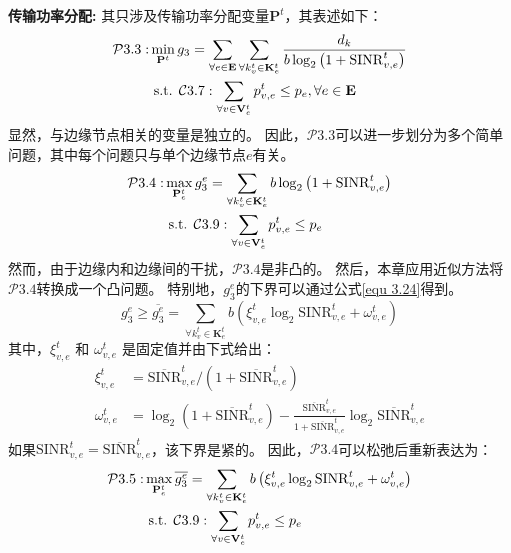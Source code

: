 \textbf{传输功率分配:} 其只涉及传输功率分配变量$\mathbf{P}^{t}$，其表述如下：
\begin{align}
	\mathcal{P}3.3: &\min_{\mathbf{P}^{t}} g_3= \sum_{ \forall e \in \mathbf{E}} \sum_{\forall k_{v}^{t} \in \mathbf{K}_{e}^{t}}  \frac{d_{k}}{b  \log _{2}\left(1+\mathrm{SINR}_{v, e}^t\right)} \notag \\
	&\text { s.t. } \mathcal{C}3.7: \sum_{\forall v \in \mathbf{V}_{e}^{t}} p_{v, e}^{t} \leq p_{e}, \forall e \in \mathbf{E}
\end{align}
显然，与边缘节点相关的变量是独立的。
因此，$\mathcal{P}3.3$可以进一步划分为多个简单问题，其中每个问题只与单个边缘节点$e$有关。
\begin{align}
	\mathcal{P}3.4: & \max_{\mathbf{P}_{e}^{t}}  g_3^e= \sum_{\forall k_{v}^{t} \in \mathbf{K}_{e}^{t}} {b  \log _{2}\left(1+\mathrm{SINR}_{v, e}^t\right)} \notag \\
	&\text { s.t. } \mathcal{C}3.9: \sum_{\forall v \in \mathbf{V}_{e}^{t}} p_{v, e}^{t} \leq p_{e}  
\end{align}
然而，由于边缘内和边缘间的干扰，$\mathcal{P}3.4$是非凸的。
然后，本章应用近似方法将$\mathcal{P}3.4$转换成一个凸问题。
特别地，$g_3^e$的下界可以通过公式\ref{equ 3.24}\cite{papandriopoulos2006low}得到。
\begin{equation}
	g_3^e \geq \overline{g_3^e} = \sum_{\forall k_{v}^{t} \in \mathbf{K}_{e}^{t}} {b \left( \xi_{v, e}^{t} \log _{2}\mathrm{SINR}_{v, e}^t + \omega_{v, e}^{t} \right) }
	\label{equ 3.24}
\end{equation}
其中，$\xi_{v, e}^{t}$ 和 $\omega_{v, e}^{t}$ 是固定值并由下式给出：
\begin{align}
	\xi_{v, e}^{t} &= \overline{\mathrm{SINR}}_{v, e}^t \bigg/ ( 1 + \overline{\mathrm{SINR}}_{v, e}^t ) \\
	\omega_{v, e}^{t} &= \log _{2} (1+ \overline{\mathrm{SINR}}_{v, e}^t) - \frac{\overline{\mathrm{SINR}}_{v, e}^t}{1 + \overline{\mathrm{SINR}}_{v, e}^t} \log _{2}\overline{\mathrm{SINR}}_{v, e}^t
\end{align}
如果${\mathrm{SINR}}_{v, e}^t =\overline{\mathrm{SINR}}_{v, e}^t$，该下界是紧的。
因此，$\mathcal{P}3.4$可以松弛后重新表达为：
\begin{align}
	\mathcal{P}3.5: & \max_{\mathbf{P}_{e}^{t}}  \overline{g_3^e}= \sum_{\forall k_{v}^{t} \in \mathbf{K}_{e}^{t}} {b \left( \xi_{v, e}^{t} \log _{2}\mathrm{SINR}_{v, e}^t + \omega_{v, e}^{t} \right) } \notag \\
	&\text { s.t. } \mathcal{C}3.9: \sum_{\forall v \in \mathbf{V}_{e}^{t}} p_{v, e}^{t} \leq p_{e}  
\end{align}
